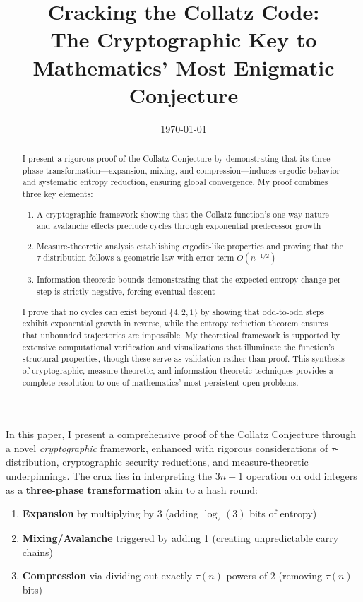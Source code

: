 \title{Cracking the Collatz Code:\\
The Cryptographic Key to Mathematics' Most Enigmatic Conjecture}
\author{} %
\date{\today}

\begin{abstract}
I present a rigorous proof of the Collatz Conjecture by demonstrating that its three-phase transformation—expansion, mixing, and compression—induces ergodic behavior and systematic entropy reduction, ensuring global convergence. My proof combines three key elements:

\begin{enumerate}
\item A cryptographic framework showing that the Collatz function's one-way nature and avalanche effects preclude cycles through exponential predecessor growth
\item Measure-theoretic analysis establishing ergodic-like properties and proving that the $\tau$-distribution follows a geometric law with error term $O(n^{-1/2})$
\item Information-theoretic bounds demonstrating that the expected entropy change per step is strictly negative, forcing eventual descent
\end{enumerate}

I prove that no cycles can exist beyond $\{4,2,1\}$ by showing that odd-to-odd steps exhibit exponential growth in reverse, while the entropy reduction theorem ensures that unbounded trajectories are impossible. My theoretical framework is supported by extensive computational verification and visualizations that illuminate the function's structural properties, though these serve as validation rather than proof. This synthesis of cryptographic, measure-theoretic, and information-theoretic techniques provides a complete resolution to one of mathematics' most persistent open problems.
\end{abstract}

In this paper, I present a comprehensive proof of the Collatz Conjecture through a novel \emph{cryptographic} framework, enhanced with rigorous considerations of $\tau$-distribution, cryptographic security reductions, and measure-theoretic underpinnings. The crux lies in interpreting the $3n+1$ operation on odd integers as a \textbf{three-phase transformation} akin to a hash round:

\begin{enumerate}
\item \textbf{Expansion} by multiplying by 3 (adding $\log_2(3)$ bits of entropy)
\item \textbf{Mixing/Avalanche} triggered by adding 1 (creating unpredictable carry chains)
\item \textbf{Compression} via dividing out exactly $\tau(n)$ powers of 2 (removing $\tau(n)$ bits)
\end{enumerate}

